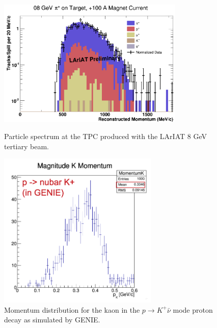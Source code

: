 \begin{figure}[h!]
\centering
\begin{minipage}{0.45\textwidth}
\centering
\includegraphics[width=3.5in]{images/Lariat/Beam}
\caption{Particle spectrum at the TPC produced with the LArIAT 8 GeV tertiary beam.}
\label{fig:BeamComp}
\end{minipage}\hfill
\centering
\begin{minipage}{0.45\textwidth}
\centering
\includegraphics[width=3in]{images/Lariat/KaonGenie}
\caption{Momentum distribution for the kaon in the $p \rightarrow K^{+} \bar\nu$ mode proton decay as simulated by GENIE.}
\label{fig:KGenie}
\end{minipage}
\end{figure}





